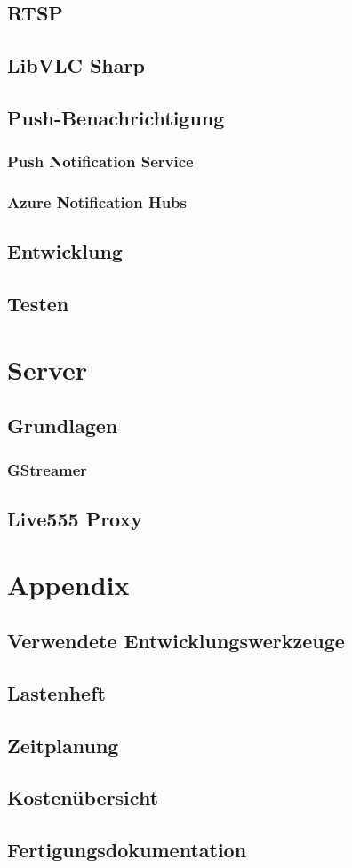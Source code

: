 \documentclass[a4paper, 12pt, twoside, openright
]{memoir}
\begin{document}
\chapter{RTSP}
\chapter{LibVLC Sharp}
\chapter{Push-Benachrichtigung}
\section{Push Notification Service}
\section{Azure Notification Hubs}
\chapter{Entwicklung}

\chapter{Testen}

\part{Server}
\chapter{Grundlagen}
\section{GStreamer}
\chapter{Live555 Proxy}

\appendix
\part{Appendix}
\chapter{Verwendete Entwicklungswerkzeuge}
\chapter{Lastenheft}
\chapter{Zeitplanung}
\chapter{Kostenübersicht}
\chapter{Fertigungsdokumentation}

\printacronyms
\end{document}
